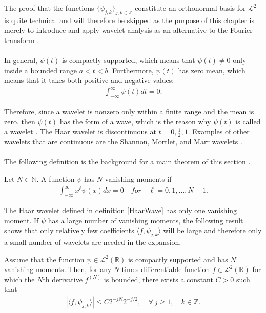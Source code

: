 The proof that the functions $\{\psi_{j,k}\}_{j,k\in\mathbb{Z}}$ constitute an orthonormal basis for $\mathcal{L}^2$ is quite technical and will therefore be skipped as the purpose of this chapter is merely to introduce and apply wavelet analysis as an alternative to the Fourier transform \cite{page 161, FSE2010} .
\\ \\
In general, $\psi(t)$ is compactly supported, which means that $\psi(t) \neq 0$ only inside a bounded range $a < t < b$. Furthermore, $\psi(t)$ has zero mean, which means that it takes both positive and negative values:
\begin{align*}
\int_{-\infty}^\infty \psi(t) dt = 0.
\end{align*}

Therefore, since a wavelet is nonzero only within a finite range and the mean is zero, then $\psi(t)$ has the form of a wave, which is the reason why $\psi(t)$ is called a wavelet \cite{page 411, Wang}. The Haar wavelet is discontinuous at $t = 0, \frac{1}{2}, 1$. Examples of other wavelets that are continuous are the Shannon, Mortlet, and Marr wavelets \cite{page 417-420, Wang}.
\\ \\
The following definition is the background for a main theorem of this section \cite{page 170, FSE2010}.

\begin{definition}
Let $N \in \mathbb{N}$. A function $\psi$ has $N$ vanishing moments if
\begin{align*}
\int_{-\infty}^\infty x^\ell \psi(x) dx = 0 \quad for \quad \ell = 0, 1, \dots, N-1.
\end{align*}
\end{definition}

The Haar wavelet defined in definition \ref{HaarWave} has only one vanishing moment. If $\psi$ has a large number of vanishing moments, the following result shows that only relatively few coefficients $\langle f, \psi_{j,k} \rangle$ will be large and therefore only a small number of wavelets are needed in the expansion.

\begin{theorem}
Assume that the function $\psi \in \mathcal{L}^2(\mathbb{R})$ is compactly supported and has $N$ vanishing moments. Then, for any $N$ times differentiable function $f \in \mathcal{L}^2(\mathbb{R})$ for which the $N$th derivative $f^{(N)}$ is bounded, there exists a constant $C > 0$ such that
\begin{align} \label{eq:decay_wave_coeff}
|\langle f, \psi_{j,k} \rangle| \leq C 2^{-jN} 2^{-j/2}, \quad \forall \ j \geq 1, \quad k \in \mathbb{Z}.
\end{align}
\end{theorem}


